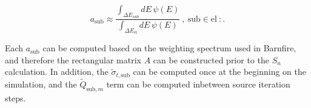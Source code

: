 \documentclass{article}
\begin{document}
\begin{equation*}
a_\text{sub} \approx \frac{\int_{\Delta E_{sub}} dE \, \psi(E)}{\int_{\Delta E_\text{el}} dE \, \psi(E)} \: , \: \text{sub} \in \text{el} \ : .
\end{equation*}

Each $a_\text{sub}$ can be computed based on the weighting spectrum used in Barnfire, and therefore the rectangular matrix $A$ can be constructed prior to the $S_n$ calculation. In addition, the $\tilde{\sigma}_{t,\text{sub}}$ can be computed once at the beginning on the simulation, and the $\tilde{Q}_{\text{sub},m}$ term can be computed inbetween source iteration steps.
 
\clearpage



\end{document}
